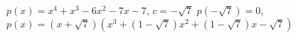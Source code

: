 {$p(x) = x^4 +x^3-6x^2-7x-7$, $c=-\sqrt{7}$}
{$p(-\sqrt{7}) = 0$, $p(x) = (x+\sqrt{7})\left(x^3+(1-\sqrt{7}) x^2+(1-\sqrt{7})x-\sqrt{7}  \right)$}